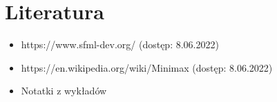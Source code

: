 \documentclass[12pt]{article}
\begin{document}
\section{Literatura}
\begin{itemize}
    \item https://www.sfml-dev.org/ (dostęp: 8.06.2022)
    \item https://en.wikipedia.org/wiki/Minimax (dostęp: 8.06.2022)
    \item Notatki z wykładów
\end{itemize}
\end{document}
